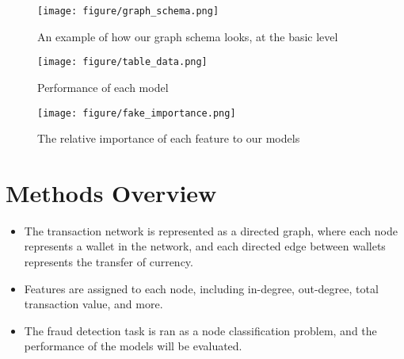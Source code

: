 \documentclass[article,36pt,extrafontsizes,oneside,openany,oldfontcommands]{memoir}
\begin{document}
\begin{adjmulticols*}{3}{0.5in}{0.5in}
\columnbreak
\begin{figure}
	\centering
	\texttt{[image: figure/graph\_schema.png]}
	\caption{An example of how our graph schema looks, at the basic level}
\end{figure}
\linebreak
\begin{figure}
	\centering
	\texttt{[image: figure/table\_data.png]}
	\caption{Performance of each model}
\end{figure}
\linebreak
\begin{figure}
	\centering
	\texttt{[image: figure/fake\_importance.png]}
	\caption{The relative importance of each feature to our models}
\end{figure}
\columnbreak

\section{Methods Overview}
\begin{adjustwidth}{0.1in}{0in}
\begin{itemize}[topsep=0pt,itemsep=0ex,partopsep=0ex,parsep=0ex]
\item The transaction network is represented as a directed graph, where each node represents a wallet in the network, and each directed edge between wallets represents the transfer of currency.
\item Features are assigned to each node, including in-degree, out-degree, total transaction value, and more.
\item The fraud detection task is ran as a node classification problem, and the performance of the models will be evaluated.


\end{itemize} 
\end{adjustwidth}



\end{adjmulticols*}
\end{document}
